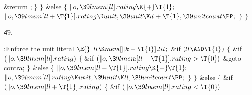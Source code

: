 \&{return} ;\6
\4${}\}{}$\2\6
\4${}\}{}$\5
\2\&{else}\5
${}\{{}$\1\6
${}\|o,\39\\{lmem}[\\{ll}].\\{rating}\K{+}\T{1};{}$\6
${}\|o,\39\\{lmem}[\\{ll}+\T{1}].\\{rating}\K\\{unit},\39\\{unit}\K\\{ll}+%
\T{1},\39\\{unitcount}\PP;{}$\6
\4${}\}{}$\2\6
\4${}\}{}$\2\par
\U49.\fi

\B{}:Enforce the unit literal \X${}\E{}$\6
$\\{ll}\K\\{mem}[\|k-\T{1}].\\{lit};{}$\6
\&{if} ${}(\\{ll}\AND\T{1}){}$\5
${}\{{}$\1\6
\&{if} ${}(\|o,\39\\{lmem}[\\{ll}].\\{rating}){}$\5
${}\{{}$\1\6
\&{if} ${}(\|o,\39\\{lmem}[\\{ll}-\T{1}].\\{rating}>\T{0}){}$\1\5
\&{goto} \\{contra};\2\6
\4${}\}{}$\5
\2\&{else}\5
${}\{{}$\1\6
${}\|o,\39\\{lmem}[\\{ll}-\T{1}].\\{rating}\K{-}\T{1};{}$\6
${}\|o,\39\\{lmem}[\\{ll}].\\{rating}\K\\{unit},\39\\{unit}\K\\{ll},\39%
\\{unitcount}\PP;{}$\6
\4${}\}{}$\2\6
\4${}\}{}$\5
\2\&{else}\5
${}\{{}$\1\6
\&{if} ${}(\|o,\39\\{lmem}[\\{ll}+\T{1}].\\{rating}){}$\5
${}\{{}$\1\6
\&{if} ${}(\|o,\39\\{lmem}[\\{ll}].\\{rating}<\T{0}){}$\5
